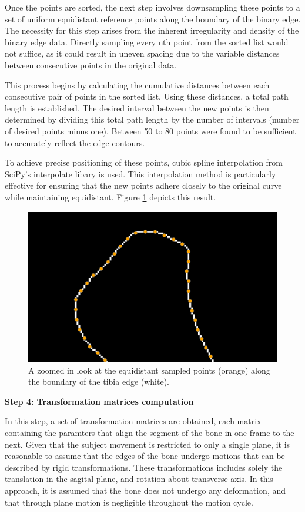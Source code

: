 \documentclass{micro-econ-thesis}
\begin{document}
Once the points are sorted, the next step involves downsampling these points to a set of uniform equidistant reference points along the boundary of the binary edge. The necessity for this step arises from the inherent irregularity and density of the binary edge data. Directly sampling every nth point from the sorted list would not suffice, as it could result in uneven spacing due to the variable distances between consecutive points in the original data.

This process begins by calculating the cumulative distances between each consecutive pair of points in the sorted list. Using these distances, a total path length is established. The desired interval between the new points is then determined by dividing this total path length by the number of intervals (number of desired points minus one). Between 50 to 80 points were found to be sufficient to accurately reflect the edge contours. 

To achieve precise positioning of these points, cubic spline interpolation from SciPy's interpolate libary is used. This interpolation method is particularly effective for ensuring that the new points adhere closely to the original curve while maintaining equidistant. 
Figure \ref{fig:downsampled} depicts this result. 
\begin{figure}[H]
	\centering
	\includegraphics[width=0.7\linewidth]{downsampled}
	\caption{A zoomed in look at the equidistant sampled points (orange) along the boundary of the tibia edge (white).}
	\label{fig:downsampled}
\end{figure}

\textbf{Step 4: Transformation matrices computation}

In this step, a set of transformation matrices are obtained, each matrix containing the paramters that align the segment of the bone in one frame to the next. Given that the subject movement is restricted to only a single plane, it is reasonable to assume that the edges of the bone undergo motions that can be described by rigid transformations. These transformations includes solely the translation in the sagital plane, and rotation about transverse axis. In this approach, it is assumed that the bone does not undergo any deformation, and that through plane motion is negligible throughout the motion cycle. 
\end{document}
